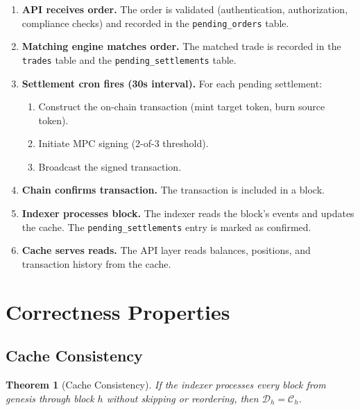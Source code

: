\documentclass[11pt,a4paper]{article}
\newtheorem{theorem}{Theorem}[section]
\begin{document}
\begin{enumerate}[nosep]
  \item \textbf{API receives order.}  The order is validated
        (authentication, authorization, compliance checks) and
        recorded in the \texttt{pending\_orders} table.
  \item \textbf{Matching engine matches order.}  The matched trade
        is recorded in the \texttt{trades} table and the
        \texttt{pending\_settlements} table.
  \item \textbf{Settlement cron fires (30s interval).}  For each
        pending settlement:
        \begin{enumerate}[nosep]
          \item Construct the on-chain transaction (mint target token,
                burn source token).
          \item Initiate MPC signing (2-of-3 threshold).
          \item Broadcast the signed transaction.
        \end{enumerate}
  \item \textbf{Chain confirms transaction.}  The transaction is
        included in a block.
  \item \textbf{Indexer processes block.}  The indexer reads the
        block's events and updates the cache.  The
        \texttt{pending\_settlements} entry is marked as confirmed.
  \item \textbf{Cache serves reads.}  The API layer reads balances,
        positions, and transaction history from the cache.
\end{enumerate}

\section{Correctness Properties}
\label{sec:correctness}

\subsection{Cache Consistency}

\begin{theorem}[Cache Consistency]
\label{thm:consistency}
If the indexer processes every block from genesis through block $h$
without skipping or reordering, then $\mathcal{D}_h = \mathcal{C}_h$.
\end{theorem}
\end{document}
